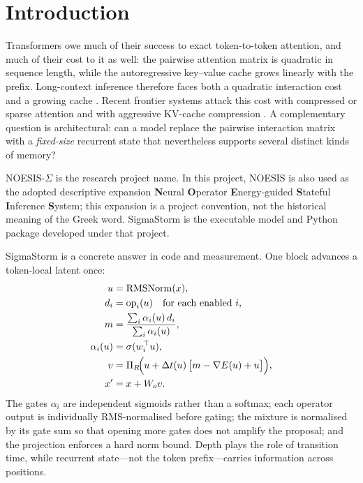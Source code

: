 \section{Introduction}

Transformers owe much of their success to exact token-to-token attention, and much of their
cost to it as well: the pairwise attention matrix is quadratic in sequence length, while the
autoregressive key--value cache grows linearly with the prefix. Long-context inference therefore
faces both a quadratic interaction cost and a growing cache
\citep{vaswani2017attention,dao2022flashattention}. Recent frontier systems attack this
cost with compressed or sparse attention and with aggressive KV-cache compression
\citep{kimi2026,deepseek2026}. A complementary question is architectural: can a model replace
the pairwise interaction matrix with a \emph{fixed-size} recurrent state that nevertheless
supports several distinct kinds of memory?

NOESIS-$\Sigma$ is the research project name. In this project, NOESIS is also used as the adopted
descriptive expansion \textbf{N}eural \textbf{O}perator \textbf{E}nergy-guided
\textbf{S}tateful \textbf{I}nference \textbf{S}ystem; this expansion is a project convention, not
the historical meaning of the Greek word.
SigmaStorm is the executable model and Python package developed under that project.

SigmaStorm is a concrete answer in code and measurement. One block advances a token-local
latent once:
\begin{equation}
  \label{eq:block}
  \begin{aligned}
    u &= \mathrm{RMSNorm}(x),\\
    d_i &= \mathrm{op}_i(u) \quad \text{for each enabled } i,\\
    m &= \frac{\sum_i \alpha_i(u)\,d_i}{\sum_i \alpha_i(u)},\\
    \alpha_i(u) &= \sigma(w_i^\top u),\\
    v &= \Pi_{R}\!\Big(u + \Delta t(u)\,\big[m - \nabla E(u) + u\big]\Big),\\
    x' &= x + W_o v .
  \end{aligned}
\end{equation}
The gates $\alpha_i$ are independent sigmoids rather than a softmax; each operator output is
individually RMS-normalised before gating; the mixture is normalised by its gate sum so that
opening more gates does not amplify the proposal; and the projection enforces a hard norm
bound. Depth plays the role of transition time, while recurrent state---not the token prefix---carries
information across positions.

